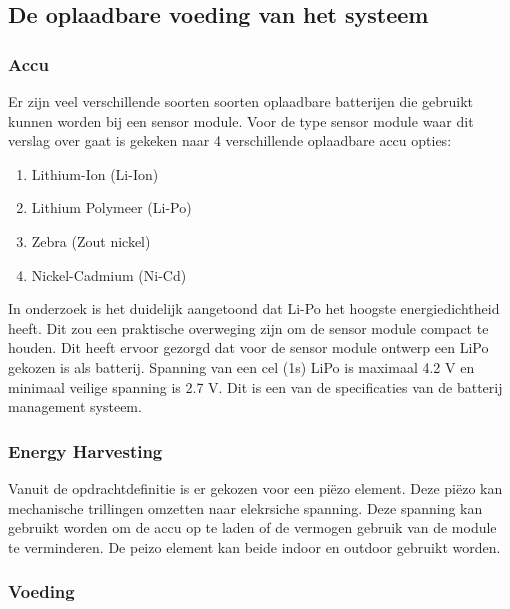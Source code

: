 

\subsection{De oplaadbare voeding van het systeem} \label{sec:energy}
\subsubsection{Accu} \label{sec:batterijOntwerp}
Er zijn veel verschillende soorten soorten oplaadbare batterijen die gebruikt kunnen worden bij een sensor module. 
Voor de type sensor module waar dit verslag over gaat is gekeken naar 4 verschillende oplaadbare accu opties\cite{battery_comparison}:

\begin{enumerate}
    \item Lithium-Ion (Li-Ion)
    \item Lithium Polymeer (Li-Po)
    \item Zebra (Zout nickel) 
    \item Nickel-Cadmium (Ni-Cd)
\end{enumerate}

In onderzoek \cite{battery_comparison} is het duidelijk aangetoond dat Li-Po het hoogste energiedichtheid heeft. Dit zou een praktische overweging zijn om de sensor module compact te houden. Dit heeft ervoor gezorgd dat voor de sensor module ontwerp een LiPo gekozen is als batterij. Spanning van een cel (1s) LiPo is maximaal 4.2 V en minimaal veilige spanning is 2.7 V\cite{BatteryComparison}. Dit is een van de specificaties van de batterij management systeem. 

\subsubsection{Energy Harvesting}

Vanuit de opdrachtdefinitie is er gekozen voor een piëzo element. Deze piëzo kan mechanische trillingen omzetten naar elekrsiche spanning. Deze spanning kan gebruikt worden om de accu op te laden of de vermogen gebruik van de module te verminderen. De peizo element kan beide indoor en outdoor gebruikt worden.


\subsubsection{Voeding} \label{sec:voeding}

